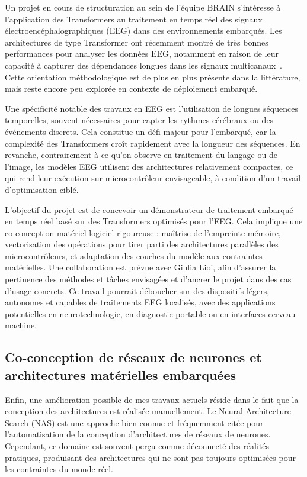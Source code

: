 \documentclass[11pt]{report}
\begin{document}
Un projet en cours de structuration au sein de l'équipe BRAIN s'intéresse à l'application des Transformers au traitement en temps réel des signaux électroencéphalographiques (EEG) dans des environnements embarqués. Les architectures de type Transformer ont récemment montré de très bonnes performances pour analyser les données EEG, notamment en raison de leur capacité à capturer des dépendances longues dans les signaux multicanaux~\cite{tegon2025}. Cette orientation méthodologique est de plus en plus présente dans la littérature, mais reste encore peu explorée en contexte de déploiement embarqué.

Une spécificité notable des travaux en EEG est l'utilisation de longues séquences temporelles, souvent nécessaires pour capter les rythmes cérébraux ou des événements discrets. Cela constitue un défi majeur pour l'embarqué, car la complexité des Transformers croît rapidement avec la longueur des séquences. En revanche, contrairement à ce qu'on observe en traitement du langage ou de l'image, les modèles EEG utilisent des architectures relativement compactes, ce qui rend leur exécution sur microcontrôleur envisageable, à condition d'un travail d'optimisation ciblé.

L'objectif du projet est de concevoir un démonstrateur de traitement embarqué en temps réel basé sur des Transformers optimisés pour l'EEG. Cela implique une co-conception matériel-logiciel rigoureuse : maîtrise de l'empreinte mémoire, vectorisation des opérations pour tirer parti des architectures parallèles des microcontrôleurs, et adaptation des couches du modèle aux contraintes matérielles. Une collaboration est prévue avec Giulia Lioi, afin d'assurer la pertinence des méthodes et tâches envisagées et d'ancrer le projet dans des cas d'usage concrets. Ce travail pourrait déboucher sur des dispositifs légers, autonomes et capables de traitements EEG localisés, avec des applications potentielles en neurotechnologie, en diagnostic portable ou en interfaces cerveau-machine.

\subsection{Co-conception de réseaux de neurones et architectures matérielles embarquées}

Enfin, une amélioration possible de mes travaux actuels réside dans le fait que la conception des architectures est réalisée manuellement. Le Neural Architecture Search (NAS) est une approche bien connue et fréquemment citée pour l'automatisation de la conception d'architectures de réseaux de neurones. Cependant, ce domaine est souvent perçu comme déconnecté des réalités pratiques, produisant des architectures qui ne sont pas toujours optimisées pour les contraintes du monde réel.
\end{document}
